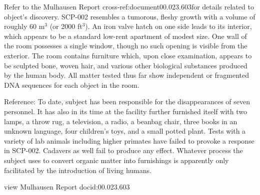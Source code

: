  Refer to the Mulhausen Report \lb cross-ref:\linebreak document00.023.603\rb for details related to object's discovery. SCP-002 resembles a tumorous, fleshy growth with a volume of roughly 60 m$^3$ (or 2000 ft$^3$). An iron valve hatch on one side leads to its interior, which appears to be a standard low-rent apartment of modest size. One wall of the room possesses a single window, though no such opening is visible from the exterior. The room contains furniture which, upon close examination, appears to be sculpted bone, woven hair, and various other biological substances produced by the human body. All matter tested thus far show independent or fragmented DNA sequences for each object in the room.

Reference: To date, subject has been responsible for the disappearances of seven personnel. It has also in its time at the facility further furnished itself with two lamps, a throw rug, a television, a radio, a beanbag chair, three books in an unknown language, four children's toys, and a small potted plant. Tests with a variety of lab animals including higher primates have failed to provoke a response in SCP-002. Cadavers as well fail to produce any effect. Whatever process the subject uses to convert organic matter into furnishings is apparently only facilitated by the introduction of living humans.

\begin{boxedminipage}{\textwidth}
view Mulhausen Report docid:00.023.603
\end{boxedminipage}

